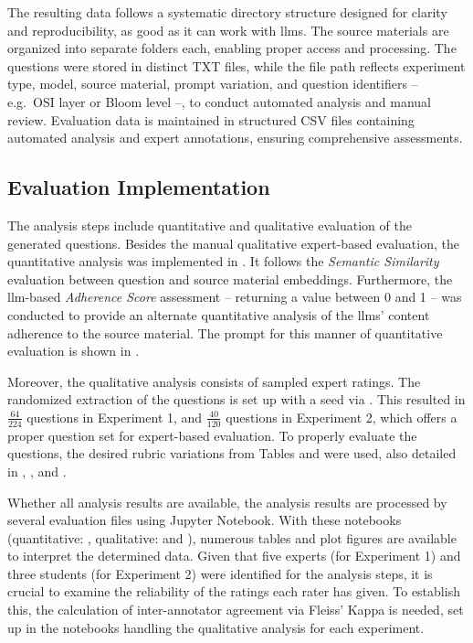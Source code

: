 \pagebreak

The resulting data follows a systematic directory structure designed for clarity and reproducibility, as good as it can work with \ac{llms}. The source materials are organized into separate folders each, enabling proper access and processing. The questions were stored in distinct TXT files, while the file path reflects experiment type, model, source material, prompt variation, and question identifiers -- e.g.\ OSI layer or Bloom level --, to conduct automated analysis and manual review. Evaluation data is maintained in structured CSV files containing automated analysis and expert annotations, ensuring comprehensive assessments.

\subsection{Evaluation Implementation}

The analysis steps include quantitative and qualitative evaluation of the generated questions. Besides the manual qualitative expert-based evaluation, the quantitative analysis was implemented in . It follows the \textit{Semantic Similarity} evaluation between question and source material embeddings. Furthermore, the \ac{llm}-based \textit{Adherence Score} assessment -- returning a value between 0 and 1 -- was conducted to provide an alternate quantitative analysis of the \ac{llms}' content adherence to the source material. The prompt for this manner of quantitative evaluation is shown in .

Moreover, the qualitative analysis consists of sampled expert ratings. The randomized extraction of the questions is set up with a seed via . This resulted in $\frac{64}{224}$ questions in Experiment 1, and $\frac{40}{120}$ questions in Experiment 2, which offers a proper question set for expert-based evaluation. To properly evaluate the questions, the desired rubric variations from Tables  and  were used, also detailed in , , and . 

Whether all analysis results are available, the analysis results are processed by several evaluation files using Jupyter Notebook. With these notebooks (quantitative: , qualitative:  and ), numerous tables and plot figures are available to interpret the determined data. Given that five experts (for Experiment 1) and three students (for Experiment 2) were identified for the analysis steps, it is crucial to examine the reliability of the ratings each rater has given. To establish this, the calculation of inter-annotator agreement via Fleiss' Kappa is needed, set up in the notebooks handling the qualitative analysis for each experiment.

